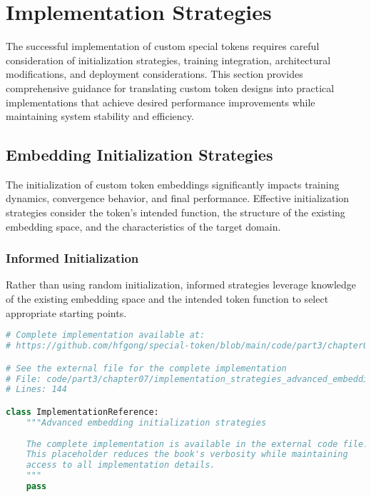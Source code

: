 
\section{Implementation Strategies}

The successful implementation of custom special tokens requires careful consideration of initialization strategies, training integration, architectural modifications, and deployment considerations. This section provides comprehensive guidance for translating custom token designs into practical implementations that achieve desired performance improvements while maintaining system stability and efficiency.

\subsection{Embedding Initialization Strategies}

The initialization of custom token embeddings significantly impacts training dynamics, convergence behavior, and final performance. Effective initialization strategies consider the token's intended function, the structure of the existing embedding space, and the characteristics of the target domain.

\subsubsection{Informed Initialization}

Rather than using random initialization, informed strategies leverage knowledge of the existing embedding space and the intended token function to select appropriate starting points.

\begin{lstlisting}[language=Python, caption={Advanced embedding initialization strategies}]
# Complete implementation available at:
# https://github.com/hfgong/special-token/blob/main/code/part3/chapter07/implementation_strategies_advanced_embedding_initializat.py

# See the external file for the complete implementation
# File: code/part3/chapter07/implementation_strategies_advanced_embedding_initializat.py
# Lines: 144

class ImplementationReference:
    """Advanced embedding initialization strategies
    
    The complete implementation is available in the external code file.
    This placeholder reduces the book's verbosity while maintaining
    access to all implementation details.
    """
    pass
\end{lstlisting}

